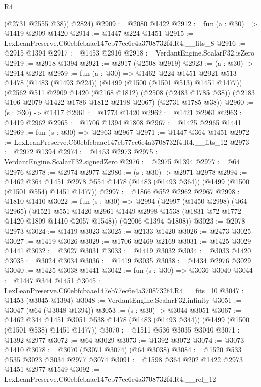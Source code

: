 \begin{lexlean}{R4}
\begin{coremodule}
        (@2731 @2555 @38))
      @2824)
@2909 := @2080 @1422
@2912 := fun (a : @30) => @1419 @2909 @1420
@2914 := @1447 @224 @1451
@2915 := LexLeanPreserve.C60ebfcbaae147eb77ec6e4a3708732f4.R4.__fits_8
@2916 := @2915 @1394
@2917 := @1453 @2916
@2918 := VerdantEngine.ScalarF32.isZero
@2919 := @2918 @1394
@2921 := @2917 (@2508 @2919)
@2923 := (a : @30) -> @2914 @2921
@2959 := fun (a : @30) =>
  @1462
    @224
    @1451
    @2921
    @513
    @1478
    (@1483 (@1493 @224))
    (@1499 (@1500 (@1501 @513) @1451 @1477))
    (@2562
      @511
      @2909
      @1420
      (@2168 @1812)
      (@2508 (@2483 @1785 @38))
      (@2183 @106 @2079 @1422 @1786 @1812 @2198 @2067)
      (@2731 @1785 @38))
@2960 := (s : @30) -> @1417
@2961 := @1773 @1420
@2962 := @1421 @2961
@2963 := @1419 @2962
@2965 := @1706 @1394 @1808
@2967 := @1425 @2965 @1441
@2969 := fun (s : @30) => @2963 @2967
@2971 := @1447 @364 @1451
@2972 := LexLeanPreserve.C60ebfcbaae147eb77ec6e4a3708732f4.R4.__fits_12
@2973 := @2972 @1394
@2974 := @1453 @2973
@2975 := VerdantEngine.ScalarF32.signedZero
@2976 := @2975 @1394
@2977 := @64 @2976
@2978 := @2974 @2977
@2980 := (s : @30) -> @2971 @2978
@2994 := @1462
    @364
    @1451
    @2978
    @554
    @1478
    (@1483 (@1493 @364))
    (@1499 (@1500 (@1501 @554) @1451 @1477))
@2997 := @1866 @552 @2962 @2967
@2998 := @1810 @1410
@3022 := fun (s : @30) =>
  @2994
    (@2997
      (@1450 @2998)
      (@64 @2965)
      (@1521 @551 @1420 @2961 @1449 @2998 @1538 (@1831 @72 @1772 @1420 @1809 @1410 @2057 @1548))
      (@2006 @1394 @1808))
@3023 := @2078 @2973
@3024 := @1419 @3023
@3025 := @2133 @1420
@3026 := @2473 @3025
@3027 := @1419 @3026
@3029 := @1706 @2469 @2169
@3031 := @1425 @3029 @1441
@3032 := @3027 @3031
@3033 := @1419 @3032
@3034 := @3033 @1420
@3035 := @3024 @3034
@3036 := @1419 @3035
@3038 := @1434 @2976 @3029
@3040 := @1425 @3038 @1441
@3042 := fun (s : @30) => @3036 @3040
@3044 := @1447 @344 @1451
@3045 := LexLeanPreserve.C60ebfcbaae147eb77ec6e4a3708732f4.R4.__fits_10
@3047 := @1453 (@3045 @1394)
@3048 := VerdantEngine.ScalarF32.infinity
@3051 := @3047 (@64 (@3048 @1394))
@3053 := (s : @30) -> @3044 @3051
@3067 := @1462
    @344
    @1451
    @3051
    @538
    @1478
    (@1483 (@1493 @344))
    (@1499 (@1500 (@1501 @538) @1451 @1477))
@3070 := @1511 @536 @3035 @3040
@3071 := @1392 @2977
@3072 := @64 @3029
@3073 := @1392 @3072
@3074 := @3073 @1410
@3078 := @3070 (@3071 @3074) (@64 @3038)
@3084 := @1520 @533 @535 @3023 @3034 @2977 @3074
@3091 := @1598 @364 @202 @1422 @2973 @1451 @2977 @1549
@3092 := LexLeanPreserve.C60ebfcbaae147eb77ec6e4a3708732f4.R4.__rel_12

\end{coremodule}
\end{lexlean}

